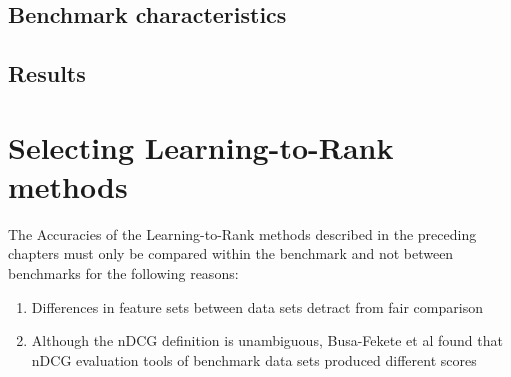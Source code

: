 \section{Benchmark characteristics}
\section{Results}

\chapter{Selecting Learning-to-Rank methods}
The Accuracies of the Learning-to-Rank methods described in the preceding chapters must only be compared within the benchmark and not between benchmarks for the following reasons:
\begin{enumerate}
\item Differences in feature sets between data sets detract from fair comparison
\item Although the \ac{nDCG} definition is unambiguous, Busa-Fekete et al\cite{Busa-Fekete2012} found that \ac{nDCG} evaluation tools of benchmark data sets produced different scores
\end{enumerate}

